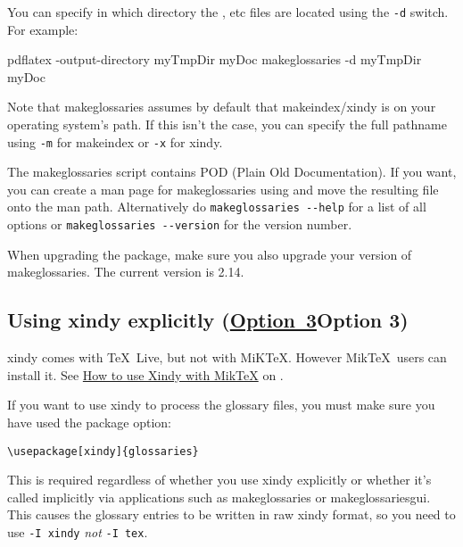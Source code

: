 \documentclass[report,inlinetitle]{nlctdoc}
\newcommand*{\opt}[1]{\hyperlink{option#1}{Option~#1}}
\begin{document}
You can specify in which directory the , 
 etc files are located using the \texttt{-d} switch.
For example:
\begin{prompt}
pdflatex -output-directory myTmpDir myDoc
makeglossaries -d myTmpDir myDoc
\end{prompt}
Note that \gls*{makeglossaries} assumes by default that
\gls*{makeindex}\slash\gls*{xindy} is on your operating system's
path. If this isn't the case, you can specify the full pathname
using \texttt{-m}  for \gls*{makeindex}
or \texttt{-x}  for \gls*{xindy}.

The \gls{makeglossaries} script contains POD (Plain Old
Documentation). If you want, you can create a man page for
\gls*{makeglossaries} using  and move the 
resulting file onto the man path. Alternatively do
\texttt{makeglossaries -{}-help} for a list of all options or
\texttt{makeglossaries -{}-version} for the version number.

\begin{important}
When upgrading the  package, make sure you also
upgrade your version of \gls{makeglossaries}. The current version is
2.14.
\end{important}

\subsection[Using xindy explicitly (Option~3)]{Using
\gls{xindy} explicitly (\ifpdf \opt3\else Option 3\fi)}
\label{sec:xindyapp}

\Gls{xindy} comes with \TeX~Live, but not with MiK\TeX. However
Mik\TeX\ users can install it. See
\href{http://tex.stackexchange.com/questions/71167/how-to-use-xindy-with-miktex}{How
to use Xindy with MikTeX} on
.

If you want to use \gls{xindy} to process the glossary
files, you must make sure you have used the 
 package option:
\begin{verbatim}
\usepackage[xindy]{glossaries}
\end{verbatim}
This is required regardless of whether you use \gls{xindy}
explicitly or whether it's called implicitly via applications such
as \gls{makeglossaries} or \gls{makeglossariesgui}. This causes the glossary 
entries to be written in raw \gls*{xindy} format, so you need to
use \texttt{-I xindy} \emph{not} \texttt{-I tex}.
\end{document}
